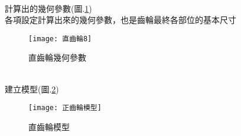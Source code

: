 \begin{itemize}
		\\
		計算出的幾何參數(圖.\ref{2.23})\\
		\qquad 各項設定計算出來的幾何參數，也是齒輪最終各部位的基本尺寸\\
		\begin{figure}[hbt!]
		\begin{center}
		\texttt{[image: 直齒輪8]}
		\caption{\Large 直齒輪幾何參數}\label{2.23}
		\end{center}
		\end{figure}
		\\
		建立模型(圖.\ref{2.24})\\
		\begin{figure}[hbt!]
		\begin{center}
		\texttt{[image: 正齒輪模型]}
		\caption{\Large 直齒輪模型}\label{2.24}
		\end{center}
		\end{figure}
		\\
		
\newpage
		

\end{itemize}
